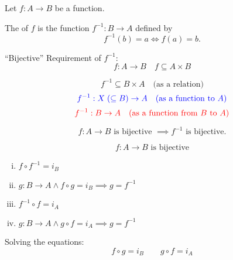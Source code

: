 \begin{frame}{}
  \begin{definition}[Inverse]
    Let $f: A \to B$ be a  function.

    The  of $f$ is the function $f^{-1}: B \to A$ defined by
    \[
      f^{-1}(b) = a \iff f(a) = b.
    \]
  \end{definition}

  \begin{alertblock}{``Bijective'' Requirement of $f^{-1}$:}
    \[
      f: A \to B \quad f \subseteq A \times B
    \]

    \pause
    \[
      f^{-1} \subseteq B \times A \quad \text{(as a relation)}
    \]
    \pause
    \[
      \textcolor{blue}{f^{-1}: X \; (\subseteq B) \to A \quad \text{(as a function to $A$)}}
    \]
    \pause
    \[
      \textcolor{red}{f^{-1}: B \to A \quad \text{(as a function from $B$ to $A$)}}
    \]
  \end{alertblock}
\end{frame}

\begin{frame}{}
  \begin{theorem}[(UD Theorem $15.4$ (ii))]
    \[
      f: A \to B \text{ is bijective } \implies f^{-1} \text{ is bijective}.
    \]
  \end{theorem}
\end{frame}

\begin{frame}{}
  \begin{theorem}
    \[
      f: A \to B \text{ is bijective}
    \]

    \begin{enumerate}[(i)]
      \item $f \circ f^{-1} = i_B$
      \item $g: B \to A \land f \circ g = i_B \implies g = f^{-1}$
      \vspace{0.30cm}
      \item $f^{-1} \circ f = i_A$
      \item $g: B \to A \land g \circ f = i_A \implies g = f^{-1}$
    \end{enumerate}
  \end{theorem}

  \pause
  \begin{alertblock}{Solving the equations:}
    \[
      f \circ g = i_B \qquad g \circ f = i_A
    \]
  \end{alertblock}
\end{frame}

